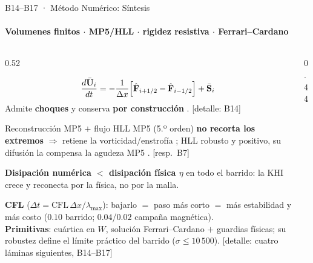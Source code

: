 \documentclass[aspectratio=169,9pt]{beamer}
\begin{document}
\begin{frame}{B14--B17 · M\'etodo Num\'erico: S\'intesis}
\framesubtitle{Volumenes finitos $\cdot$ MP5/HLL $\cdot$ rigidez resistiva $\cdot$ Ferrari--Cardano}
\begin{columns}[T]
\begin{column}{0.52\textwidth}
  \begin{tcolorbox}[EQ={Volumenes finitos (forma integral)}]
    \scriptsize
    {\setlength\abovedisplayskip{2pt}\setlength\belowdisplayskip{3pt}
    \[
      \frac{d\bar{\mathbf U}_i}{dt}
      =-\frac{1}{\Delta x}\Bigl[\hat{\mathbf F}_{i+1/2}-\hat{\mathbf F}_{i-1/2}\Bigr]
      +\bar{\mathbf S}_i
    \]}
    Admite \textbf{choques} y conserva \textbf{por construcci\'on}
    \citep{toro-2009}. \hfill{\tiny[detalle: B14]}
  \end{tcolorbox}
  \vspace{-0.06cm}
  \begin{block}{Reconstrucci\'on MP5 $+$ flujo HLL}
    \scriptsize
    MP5 (5.º orden) \textbf{no recorta los extremos} $\Rightarrow$ retiene
    la vorticidad/enstrof\'ia \citep{suresh-1997}; HLL robusto y positivo,
    su difusi\'on la compensa la agudeza MP5
    \citep{miranda-aranguren-2018}. \hfill{\tiny[resp.\ B7]}
  \end{block}
  \vspace{-0.06cm}
  \begin{tcolorbox}[RES={Criterio de dise\~no del estudio}]
    \scriptsize
    \textbf{Disipaci\'on num\'erica $<$ disipaci\'on f\'isica $\eta$} en todo
    el barrido: la KHI crece y reconecta por la f\'isica, no por la malla.
  \end{tcolorbox}
  \vspace{0.04cm}
  {\tiny
   \textbf{CFL} ($\Delta t=\mathrm{CFL}\,\Delta x/\lambda_{\max}$): bajarlo
   $=$ paso m\'as corto $=$ m\'as estabilidad y m\'as costo
   ($0.10$ barrido; $0.04$/$0.02$ campa\~na magn\'etica).\\[1pt]
   \textbf{Primitivas}: cu\'artica en $W$, soluci\'on Ferrari--Cardano
   $+$ guardias f\'isicas; su robustez define el l\'imite pr\'actico del
   barrido ($\sigma\le10\,500$).
   \hfill[detalle: cuatro l\'aminas siguientes, B14--B17]}
\end{column}
\begin{column}{0.44\textwidth}

\end{column}
\end{columns}
\end{frame}
\end{document}
